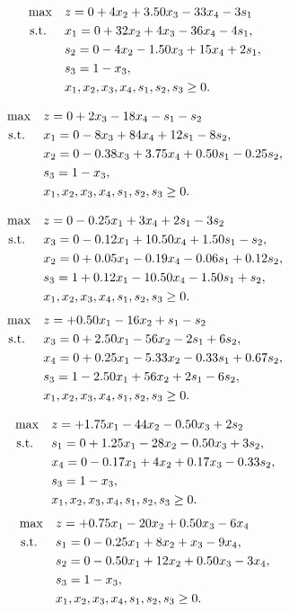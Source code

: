 \[
\begin{aligned}
\max \quad & z = 0 + 4x_2 + 3.50x_3 - 33x_4 - 3s_1 \\
\text{ s.t. } \quad 
& x_1 = 0 + 32x_2 + 4x_3 - 36x_4 - 4s_1, \\
& s_2 = 0 - 4x_2 - 1.50x_3 + 15x_4 + 2s_1, \\
& s_3 = 1 - x_3, \\
& x_1, x_2, x_3, x_4, s_1, s_2, s_3 \geq 0.
\end{aligned}
\]

\[
\begin{aligned}
\max \quad & z = 0 + 2x_3 - 18x_4 - s_1 - s_2 \\
\text{ s.t. } \quad 
& x_1 = 0 - 8x_3 + 84x_4 + 12s_1 - 8s_2, \\
& x_2 = 0 - 0.38x_3 + 3.75x_4 + 0.50s_1 - 0.25s_2, \\
& s_3 = 1 - x_3, \\
& x_1, x_2, x_3, x_4, s_1, s_2, s_3 \geq 0.
\end{aligned}
\]

\[
\begin{aligned}
\max \quad & z = 0 - 0.25x_1 + 3x_4 + 2s_1 - 3s_2 \\
\text{ s.t. } \quad 
& x_3 = 0 - 0.12x_1 + 10.50x_4 + 1.50s_1 - s_2, \\
& x_2 = 0 + 0.05x_1 - 0.19x_4 - 0.06s_1 + 0.12s_2, \\
& s_3 = 1 + 0.12x_1 - 10.50x_4 - 1.50s_1 + s_2, \\
& x_1, x_2, x_3, x_4, s_1, s_2, s_3 \geq 0.
\end{aligned}
\]
\[
\begin{aligned}
\max \quad & z = +0.50x_1 - 16x_2 + s_1 - s_2 \\
\text{ s.t. } \quad 
& x_3 = 0 + 2.50x_1 - 56x_2 - 2s_1 + 6s_2, \\
& x_4 = 0 + 0.25x_1 - 5.33x_2 - 0.33s_1 + 0.67s_2, \\
& s_3 = 1 - 2.50x_1 + 56x_2 + 2s_1 - 6s_2, \\
& x_1, x_2, x_3, x_4, s_1, s_2, s_3 \geq 0.
\end{aligned}
\]

\[
\begin{aligned}
\max \quad & z = +1.75x_1 - 44x_2 - 0.50x_3 + 2s_2 \\
\text{ s.t. } \quad 
& s_1 = 0 + 1.25x_1 - 28x_2 - 0.50x_3 + 3s_2, \\
& x_4 = 0 - 0.17x_1 + 4x_2 + 0.17x_3 - 0.33s_2, \\
& s_3 = 1 - x_3, \\
& x_1, x_2, x_3, x_4, s_1, s_2, s_3 \geq 0.
\end{aligned}
\]
\[
\begin{aligned}
\max \quad & z = +0.75x_1 - 20x_2 + 0.50x_3 - 6x_4 \\
\text{ s.t. } \quad 
& s_1 = 0 - 0.25x_1 + 8x_2 + x_3 - 9x_4, \\
& s_2 = 0 - 0.50x_1 + 12x_2 + 0.50x_3 - 3x_4, \\
& s_3 = 1 - x_3, \\
& x_1, x_2, x_3, x_4, s_1, s_2, s_3 \geq 0.
\end{aligned}
\]

